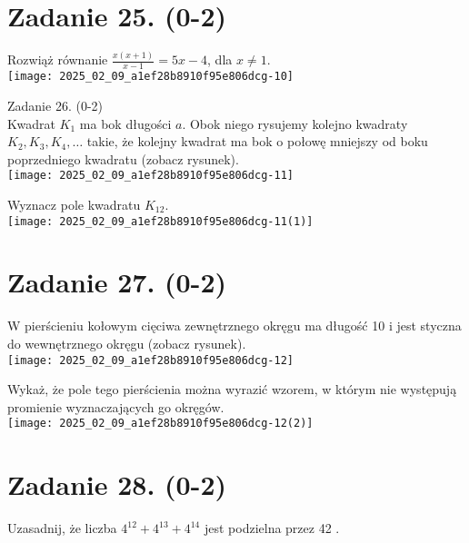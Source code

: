 \documentclass[10pt]{article}
\begin{document}
\section*{Zadanie 25. (0-2)}
Rozwiąż równanie \(\frac{x(x+1)}{x-1}=5 x-4\), dla \(x \neq 1\).\\
\texttt{[image: 2025\_02\_09\_a1ef28b8910f95e806dcg-10]}

Zadanie 26. (0-2)\\
Kwadrat \(K_{1}\) ma bok długości \(a\). Obok niego rysujemy kolejno kwadraty \(K_{2}, K_{3}, K_{4}, \ldots\) takie, że kolejny kwadrat ma bok o połowę mniejszy od boku poprzedniego kwadratu (zobacz rysunek).\\
\texttt{[image: 2025\_02\_09\_a1ef28b8910f95e806dcg-11]}

Wyznacz pole kwadratu \(K_{12}\).\\
\texttt{[image: 2025\_02\_09\_a1ef28b8910f95e806dcg-11(1)]}

\section*{Zadanie 27. (0-2)}
W pierścieniu kołowym cięciwa zewnętrznego okręgu ma długość 10 i jest styczna do wewnętrznego okręgu (zobacz rysunek).\\
\texttt{[image: 2025\_02\_09\_a1ef28b8910f95e806dcg-12]}

Wykaż, że pole tego pierścienia można wyrazić wzorem, w którym nie występują promienie wyznaczających go okręgów.\\
\texttt{[image: 2025\_02\_09\_a1ef28b8910f95e806dcg-12(2)]}

\section*{Zadanie 28. (0-2)}
Uzasadnij, że liczba \(4^{12}+4^{13}+4^{14}\) jest podzielna przez 42 .
\end{document}

